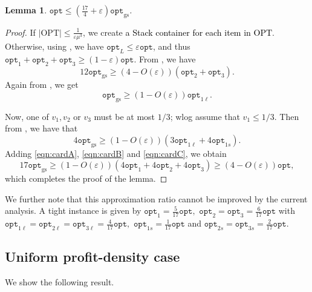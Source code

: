 \documentclass[10pt,a4paper]{amsart}
\newcommand{\kvnnew}[1]{\textcolor{black}{#1}}
\newcommand{\mt}[1]{#1}
\renewcommand{\epsilon}{\varepsilon} %
\newtheorem{theorem}{Theorem}[section]
\newtheorem{lemma}[theorem]{Lemma}
\theoremstyle{definition}
\newcommand{\alg}{\mathtt{opt}_{\mathrm{gs}}}
\newcommand{\opt}{\mathtt{opt}}
\newcommand{\optonel}{\mathtt{opt}_{1\ell}}
\newcommand{\optones}{\mathtt{opt}_{1s}}
\newcommand{\OPT}{\mathrm{OPT}}
\begin{document}
\begin{lemma}
    $\displaystyle\opt \le \left(\frac{17}{4}+\epsilon\right)\alg$.
\end{lemma}
\begin{proof}
    If $|\OPT|\le \frac{1}{\epsilon\mu^3}$, we create \kvnnew{a Stack container for each item in $\OPT$}. Otherwise, using , we have $\opt_L \le \epsilon\opt$, and thus $\opt_1+\opt_2+\opt_3 \ge (1-\epsilon)\opt$. From , we have 
    \begin{equation}
    \label{eqn:cardA}
        12\alg \ge (4-O(\epsilon))(\opt_2 + \opt_3).
    \end{equation}
     Again from , we get 
     \begin{equation}
     \label{eqn:cardB}
         \alg \ge (1-O(\epsilon))\optonel.
     \end{equation}

     Now, one of $v_1, v_2$ or $v_3$ must be at most $1/3$; wlog assume that $v_1 \le 1/3$. Then from , we have that
     \begin{equation}
     \label{eqn:cardC}
         4\alg \ge (1-O(\epsilon))(3\optonel + 4\optones).
     \end{equation}
    Adding \eqref{eqn:cardA}, \eqref{eqn:cardB} and \eqref{eqn:cardC}, we obtain 
    \[ 17\alg \ge (1-O(\epsilon))(4\opt_1+4\opt_2+4\opt_3)\ge (4-O(\epsilon))\opt,\]
    which completes the proof of the lemma.
\end{proof}


\mt{We further note that this approximation ratio cannot be improved by the current analysis. A tight instance is given by $\opt_1=\frac{5}{17}\opt,$ $\opt_2=\opt_3=\frac{6}{17}\opt$ with $\opt_{1\ell}=\opt_{2\ell}=\opt_{3\ell}=\frac{4}{17}\opt,$ $\opt_{1s}=\frac{1}{17}\opt$ and $\opt_{2s}=\opt_{3s}=\frac{2}{17}\opt.$}





\subsection{Uniform profit-density case}
\label{sec:nonrot-prof-eq-vol}
We show the following result.
\end{document}
